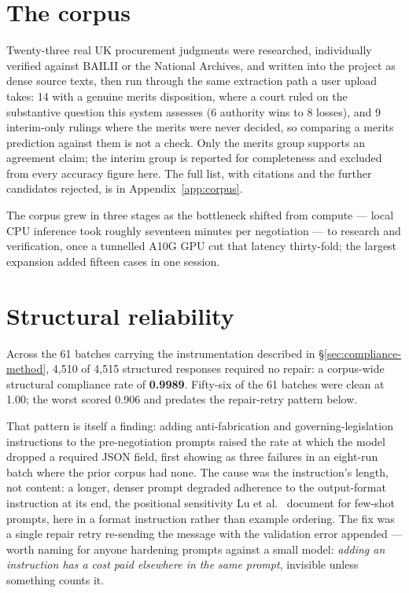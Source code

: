 \section{The corpus}
\label{sec:corpus}

Twenty-three real UK procurement judgments were researched, individually
verified against BAILII or the National Archives, and written into the
project as dense source texts, then run through the same extraction path a
user upload takes: 14 with a genuine merits disposition, where a court
ruled on the substantive question this system assesses (6 authority wins to
8 losses), and 9 interim-only rulings where the merits were never decided,
so comparing a merits prediction against them is not a check. Only the
merits group supports an agreement claim; the interim group is reported for
completeness and excluded from every accuracy figure here. The full list,
with citations and the further candidates rejected, is in
Appendix~\ref{app:corpus}.

The corpus grew in three stages as the bottleneck shifted from compute ---
local CPU inference took roughly seventeen minutes per negotiation --- to
research and verification, once a tunnelled A10G GPU cut that latency
thirty-fold; the largest expansion added fifteen cases in one session.

\section{Structural reliability}
\label{sec:structural}

Across the 61 batches carrying the instrumentation described in
\S\ref{sec:compliance-method}, 4{,}510 of 4{,}515 structured responses
required no repair: a corpus-wide structural compliance rate of
\textbf{0.9989}. Fifty-six of the 61 batches were clean at 1.00; the worst
scored 0.906 and predates the repair-retry pattern below.

That pattern is itself a finding: adding anti-fabrication and
governing-legislation instructions to the pre-negotiation prompts raised
the rate at which the model dropped a required JSON field, first showing
as three failures in an eight-run batch where the prior corpus had none.
The cause was the instruction's length, not content: a longer, denser
prompt degraded adherence to the output-format instruction at its end, the
positional sensitivity Lu et al.\ \cite{lu2022fantastically} document for
few-shot prompts, here in a format instruction rather than example
ordering. The fix was a single repair retry re-sending the message with
the validation error appended --- worth naming for anyone hardening
prompts against a small model: \emph{adding an instruction has a cost paid
elsewhere in the same prompt}, invisible unless something counts it.

